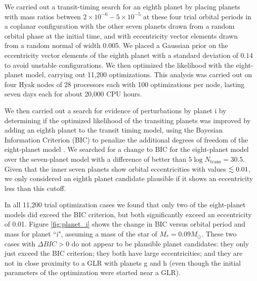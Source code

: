 \documentclass[twocolumn]{aastex63}
\begin{document}
We carried out a transit-timing search for an eighth planet by placing
planets with mass ratios between $2\times 10^{-6}-5\times 10^{-5}$ at
these four trial orbital periods
in a coplanar configuration with the other seven planets drawn from
a random orbital phase at the initial time, and with eccentricity
vector elements drawn from a random normal of width 0.005.   We
placed a Gaussian prior on the eccentricity vector elements of the eighth planet
with a standard deviation of $0.14$ to avoid unstable configurations.
We then optimized the likelihood with the eight-planet model, carrying
out 11,200 optimizations.  This analysis was carried out on four Hyak nodes of 28 processors each with 100 optimizations per node, lasting seven days each for about 20,000 CPU hours.

We then carried out a search for evidence of perturbations by planet i by
determining if the optimized likelihood of the transiting planets was improved
by adding an eighth planet to the transit timing model, using
the Bayesian Information Criterion (BIC) to penalize the additional degrees
of freedom of the eight-planet model \citep{Wit2012}.  We searched for a change
to BIC for the eight-planet model over the seven-planet model with a difference
of better than $5\log{N_\mathrm{trans}} = 30.5$.  Given that the inner seven
planets show orbital eccentricities with values $\lesssim 0.01$, we only considered
an eighth planet candidate plausible if it shows an eccentricity less than
this cutoff.

In all 11,200 trial optimization cases we found that only two of the eight-planet models
did exceed the BIC criterion, but both significantly exceed an eccentricity
of 0.01.  Figure  \ref{fig:planet_i} shows the change in BIC versus
orbital period and mass for planet ``i", assuming a mass of the star
of $M_* = 0.09 M_\odot$.   These two cases with $\Delta BIC {>} 0$
do not appear to be plausible
planet candidates:  they only just exceed the BIC criterion;  they
both have large eccentricities; and they are not in close proximity to a
GLR with planets g and h (even though the initial parameters of the optimization were started near a GLR).
\end{document}
